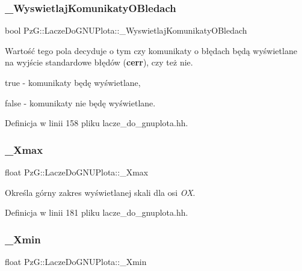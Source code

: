 \subsubsection{\texorpdfstring{\_WyswietlajKomunikatyOBledach}{\_WyswietlajKomunikatyOBledach}}
{\footnotesize\ttfamily bool Pz\+G\+::\+Lacze\+Do\+G\+N\+U\+Plota\+::\+\_\+\+Wyswietlaj\+Komunikaty\+O\+Bledach\hspace{0.3cm}{\ttfamily [protected]}}

Wartość tego pola decyduje o tym czy komunikaty o błędach będą wyświetlane na wyjście standardowe błędów ({\bfseries{cerr}}), czy też nie. \begin{DoxyItemize}
\item {\ttfamily true} -\/ komunikaty będę wyświetlane, \item {\ttfamily false} -\/ komunikaty nie będę wyświetlane. \end{DoxyItemize}


Definicja w linii 158 pliku lacze\+\_\+do\+\_\+gnuplota.\+hh.

\mbox{\label{class_pz_g_1_1_lacze_do_g_n_u_plota_a847e00678a413ab076ccbcb7eba3ae58}} 
\subsubsection{\texorpdfstring{\_Xmax}{\_Xmax}}
{\footnotesize\ttfamily float Pz\+G\+::\+Lacze\+Do\+G\+N\+U\+Plota\+::\+\_\+\+Xmax\hspace{0.3cm}{\ttfamily [protected]}}

Określa górny zakres wyświetlanej skali dla osi {\itshape OX}. 

Definicja w linii 181 pliku lacze\+\_\+do\+\_\+gnuplota.\+hh.

\mbox{\label{class_pz_g_1_1_lacze_do_g_n_u_plota_a69d530edfe769e38448972e897456deb}} 
\subsubsection{\texorpdfstring{\_Xmin}{\_Xmin}}
{\footnotesize\ttfamily float Pz\+G\+::\+Lacze\+Do\+G\+N\+U\+Plota\+::\+\_\+\+Xmin\hspace{0.3cm}{\ttfamily [protected]}}


